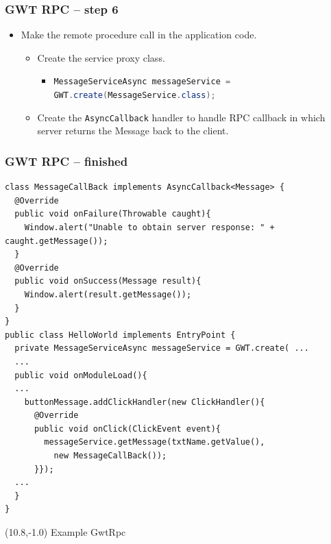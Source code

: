 \documentclass[10pt,table, xcolor=pdflatex]{beamer}
\newcommand{\inlinejava}{\lstinline[language={Java}]}
\begin{document}
\begin{frame}[fragile]\frametitle{GWT RPC -- step 6}
  \begin{itemize}
	\item Make the remote procedure call in the application code.
      \begin{itemize}
		\item Create the service proxy class.
          \begin{itemize}
        	\item
            	\lstset{basicstyle=\footnotesize\ttfamily}
            	\inlinejava{MessageServiceAsync messageService = GWT.create(MessageService.class);}
          \end{itemize}
        \item Create the \texttt{AsyncCallback} handler to handle RPC callback in which server returns the Message back to the client.
      \end{itemize}
  \end{itemize}
\end{frame}


\begin{frame}[fragile]\frametitle{GWT RPC -- finished}
	\lstset{language=Java, basicstyle=\footnotesize\ttfamily}
    \begin{lstlisting}
class MessageCallBack implements AsyncCallback<Message> {
  @Override
  public void onFailure(Throwable caught){
    Window.alert("Unable to obtain server response: " + caught.getMessage());
  }
  @Override
  public void onSuccess(Message result){
    Window.alert(result.getMessage());
  }
}
public class HelloWorld implements EntryPoint {
  private MessageServiceAsync messageService = GWT.create( ...
  ...
  public void onModuleLoad(){
  ...
    buttonMessage.addClickHandler(new ClickHandler(){
      @Override
      public void onClick(ClickEvent event){
        messageService.getMessage(txtName.getValue(),
          new MessageCallBack());
      }});
  ...
  }
}
    \end{lstlisting}
\begin{textblock}{15}(10.8,-1.0)
    {\footnotesize Example GwtRpc}
\end{textblock}
\end{frame}
\end{document}
